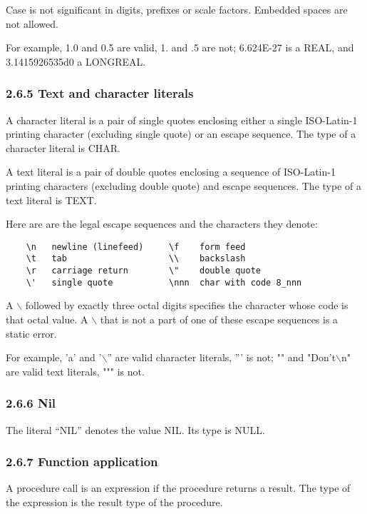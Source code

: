 \documentclass[10pt]{article}
\begin{document}
Case is not significant in digits, prefixes or scale factors.  Embedded spaces
are not allowed.

For example, 1.0 and 0.5 are valid, 1.  and .5 are not; 6.624E-27 is a REAL,
and 3.1415926535d0 a LONGREAL.

\subsubsection*{2.6.5 Text and character literals}

A character literal is a pair of single quotes enclosing either a single
ISO-Latin-1 printing character (excluding single quote) or an escape
sequence.  The type of a character literal is CHAR.

A text literal is a pair of double quotes enclosing a sequence of ISO-Latin-1
printing characters (excluding double quote) and escape sequences.  The type of
a text literal is TEXT.

Here are are the legal escape sequences and the characters they denote:
\begin{verbatim}
    \n   newline (linefeed)     \f    form feed
    \t   tab                    \\    backslash
    \r   carriage return        \"    double quote
    \'   single quote           \nnn  char with code 8_nnn
\end{verbatim}
A $\backslash$ followed by exactly three octal digits specifies the character
whose code is that octal value.  A $\backslash$ that is not a part of one of
these escape sequences is a static error.

For example, 'a' and '$\backslash$'' are valid character literals, ''' is not; "" and "Don't$\backslash$n" are valid text literals, """ is not.

\subsubsection*{2.6.6 Nil}

The literal ``NIL'' denotes the value NIL.  Its type is NULL.

\subsubsection*{2.6.7 Function application}

A procedure call is an expression if the procedure returns a result.  The type
of the expression is the result type of the procedure.
\end{document}
